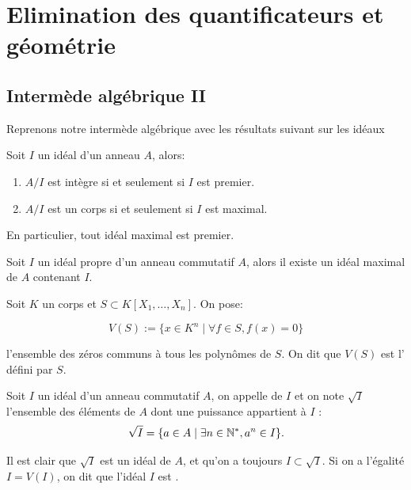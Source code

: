 \chapter{Elimination des quantificateurs et géométrie}

\section{Intermède algébrique II}

Reprenons notre intermède algébrique avec les résultats suivant sur les idéaux

\begin{prop}\label{prop-quotient-ideal-maximal}
Soit $I$ un idéal d'un anneau $A$, alors:
\begin{enumerate}[label= (\roman*)]
    \item $A/I$ est intègre si et seulement si $I$ est premier.
    \item $A/I$ est un corps si et seulement si $I$ est maximal.
\end{enumerate}
En particulier, tout idéal maximal est premier.
\end{prop}

\begin{theo}\label{theo-Krull}
Soit $I$ un idéal propre d'un anneau commutatif $A$, alors il existe un idéal
maximal de $A$ contenant $I$.
\end{theo}

\begin{defi}
    Soit $K$ un corps et $S \subset K[X_1, \ldots, X_n]$. On pose:

    \[ V(S) := \{ x \in K^n \mid \forall f \in S, f(x) = 0 \} \]

    l'ensemble des zéros communs à tous les polynômes de $S$. On dit que $V(S)$
    est l' défini par $S$.
\end{defi}

\begin{defi}\label{defi-ideal-radical}
Soit $I$ un idéal d'un anneau commutatif $A$, on appelle  de $I$ et on
note $\sqrt{I}$ l'ensemble des éléments de $A$ dont une puissance appartient à
$I$ : \[ \sqrt{I} = \{ a \in A \mid \exists n \in \mathbb{N}^{*} , a^n \in I \}.\]

Il est clair que $\sqrt{I}$ est un idéal de $A$, et qu'on a toujours $I \subset
\sqrt{I}$. Si on a l'égalité $I = V(I)$, on dit que l'idéal $I$ est .
\end{defi}

